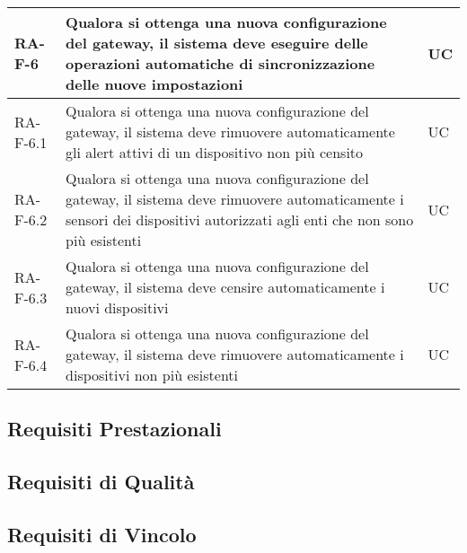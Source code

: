 \begin{center}
\begin{longtable}{|p{3cm}|p{10cm}|p{2cm}|}
		\rowcolor{redroundrobin}
		\textbf{RA-F-6} & Qualora si ottenga una nuova configurazione del gateway, il sistema deve eseguire delle operazioni automatiche di sincronizzazione delle nuove impostazioni & UC \\ \hline
		{\color{gray} RA-F-}6.1 & Qualora si ottenga una nuova configurazione del gateway, il sistema deve rimuovere automaticamente gli alert attivi di un dispositivo non più censito  & UC \\ \hline
		{\color{gray} RA-F-}6.2 & Qualora si ottenga una nuova configurazione del gateway, il sistema deve rimuovere automaticamente i sensori dei dispositivi autorizzati agli enti che non sono più esistenti & UC \\ \hline
		{\color{gray} RA-F-}6.3 & Qualora si ottenga una nuova configurazione del gateway, il sistema deve censire automaticamente i nuovi dispositivi & UC \\ \hline
		{\color{gray} RA-F-}6.4 & Qualora si ottenga una nuova configurazione del gateway, il sistema deve rimuovere automaticamente i dispositivi non più esistenti & UC \\ \hline

		\end{longtable}
	\end{center}

	\subsection{Requisiti Prestazionali}
	\subsection{Requisiti di Qualità}
	\subsection{Requisiti di Vincolo}